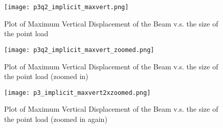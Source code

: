 \documentclass[letterpaper, 10 pt, conference]{ieeeconf}  %
\begin{document}
\begin{figure}[!ht]
        \centering
        \texttt{[image: p3q2\_implicit\_maxvert.png]}
        \caption{Plot of Maximum Vertical Displacement of the Beam v.s. the size of the point load}
        \label{"fig:p3q2_benefit"}
\end{figure}


\begin{figure}[!ht]
        \centering
        \texttt{[image: p3q2\_implicit\_maxvert\_zoomed.png]}
        \caption{Plot of Maximum Vertical Displacement of the Beam v.s. the size of the point load (zoomed in)}
        \label{"fig:p3q2_benefit_zoomed"}
\end{figure}

\begin{figure}[!ht]
        \centering
        \texttt{[image: p3\_implicit\_maxvert2xzoomed.png]}
        \caption{Plot of Maximum Vertical Displacement of the Beam v.s. the size of the point load (zoomed in again)}
        \label{"fig:p3q2_benefit_zoomed2x"}
\end{figure}

\addtolength{\textheight}{-12cm}   %




\end{document}
